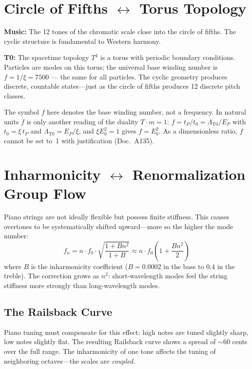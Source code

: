 \section{\texorpdfstring{Circle of Fifths $\leftrightarrow$ Torus Topology}{Circle of Fifths -- Torus Topology}}

\textbf{Music:} The 12 tones of the chromatic scale close into the circle of fifths. The cyclic structure is fundamental to Western harmony.

\textbf{T0:} The spacetime topology $T^4$ is a torus with periodic boundary conditions. Particles are modes on this torus; the universal base winding number is $f = 1/\xi = 7500$ — the same for all particles. The cyclic geometry produces discrete, countable states---just as the circle of fifths produces 12 discrete pitch classes.

The symbol $f$ here denotes the base winding number, not a frequency. In natural units $f$ is only another reading of the duality $T\cdot m = 1$: $f = t_P/t_0 = \Lambda_{\text{T0}}/E_P$ with $t_0 = \xi\,t_P$ and $\Lambda_{\text{T0}} = E_P/\xi$, and $\xi E_0^2 = 1$ gives $f = E_0^2$. As a dimensionless ratio, $f$ cannot be set to~1 with justification (Doc.~A135).

\section{\texorpdfstring{Inharmonicity $\leftrightarrow$ Renormalization Group Flow}{Inharmonicity -- Renormalization Group Flow}}

Piano strings are not ideally flexible but possess finite stiffness. This causes overtones to be systematically shifted upward---more so the higher the mode number:
\begin{equation}
	f_n = n \cdot f_0 \cdot \sqrt{\frac{1 + B n^2}{1 + B}} \approx n \cdot f_0 \left(1 + \frac{B n^2}{2}\right)
\end{equation}
where $B$ is the inharmonicity coefficient ($B = 0.0002$ in the bass to $0.4$ in the treble). The correction grows as $n^2$: short-wavelength modes feel the string stiffness more strongly than long-wavelength modes.

\subsection{The Railsback Curve}

Piano tuning must compensate for this effect: high notes are tuned slightly sharp, low notes slightly flat. The resulting Railsback curve shows a spread of $\sim$60 cents over the full range. The inharmonicity of one tone affects the tuning of neighboring octaves---the scales are \emph{coupled}.

